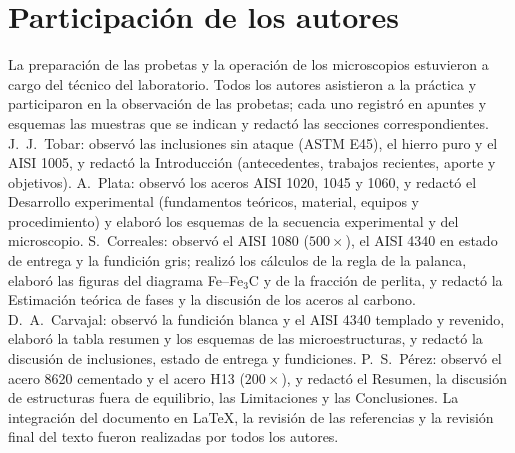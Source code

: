 \documentclass[journal,11pt]{IEEEtran}
\newcommand{\FeFeC}{Fe--Fe$_3$C}
\begin{document}
\section*{Participación de los autores}
La preparación de las probetas y la operación de los microscopios estuvieron a cargo del técnico del laboratorio. Todos los autores asistieron a la práctica y participaron en la observación de las probetas; cada uno registró en apuntes y esquemas las muestras que se indican y redactó las secciones correspondientes. J.~J.~Tobar: observó las inclusiones sin ataque (ASTM E45), el hierro puro y el AISI 1005, y redactó la Introducción (antecedentes, trabajos recientes, aporte y objetivos). A.~Plata: observó los aceros AISI 1020, 1045 y 1060, y redactó el Desarrollo experimental (fundamentos teóricos, material, equipos y procedimiento) y elaboró los esquemas de la secuencia experimental y del microscopio. S.~Correales: observó el AISI 1080 ($500\times$), el AISI 4340 en estado de entrega y la fundición gris; realizó los cálculos de la regla de la palanca, elaboró las figuras del diagrama \FeFeC{} y de la fracción de perlita, y redactó la Estimación teórica de fases y la discusión de los aceros al carbono. D.~A.~Carvajal: observó la fundición blanca y el AISI 4340 templado y revenido, elaboró la tabla resumen y los esquemas de las microestructuras, y redactó la discusión de inclusiones, estado de entrega y fundiciones. P.~S.~Pérez: observó el acero 8620 cementado y el acero H13 ($200\times$), y redactó el Resumen, la discusión de estructuras fuera de equilibrio, las Limitaciones y las Conclusiones. La integración del documento en \LaTeX, la revisión de las referencias y la revisión final del texto fueron realizadas por todos los autores.
\end{document}
